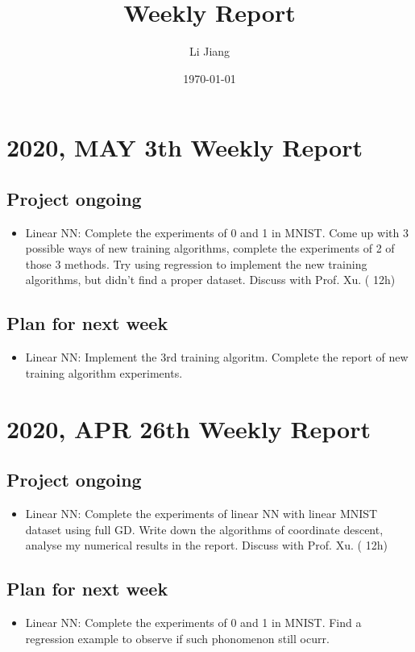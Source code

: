 \documentclass[10pt]{amsart}
\title{Weekly Report}
\date{\today}
\author{Li Jiang}%
\begin{document}
\null
\vfill
\maketitle

\section{2020, MAY 3th Weekly Report }
\subsection{Project ongoing}
\begin{itemize}
	\item Linear NN: Complete the experiments of 0 and 1 in MNIST. Come up with 3 possible ways of new training algorithms, complete  the experiments of 2 of those 3 methods. Try using regression to implement the new training algorithms, but didn't find a proper dataset. Discuss  with Prof. Xu.  ({\color{blue} 12h})
\end{itemize}
\subsection{Plan for next week}
\begin{itemize}
	\item Linear NN: Implement the 3rd training algoritm. Complete the report of new training algorithm experiments.
\end{itemize}


\section{2020, APR 26th Weekly Report }
\subsection{Project ongoing}
\begin{itemize}
	\item Linear NN: Complete the experiments of linear NN with  linear MNIST dataset using full GD.  Write down the algorithms of coordinate descent, analyse my numerical results in the report. Discuss with Prof. Xu. ({\color{blue} 12h})
\end{itemize}
\subsection{Plan for next week}
\begin{itemize}
	\item Linear NN: Complete the experiments of 0 and 1 in MNIST. Find a regression example to observe if such phonomenon still ocurr.
\end{itemize}
\end{document}
